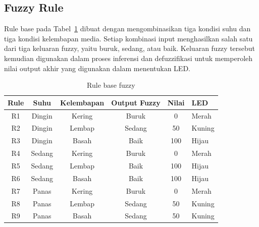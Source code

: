\documentclass[12pt,a4paper]{article}
\begin{document}
\subsection{Fuzzy Rule}

Rule base pada Tabel~\ref{tab:fuzzy-rule} dibuat dengan mengombinasikan tiga kondisi suhu dan tiga kondisi kelembapan media. Setiap kombinasi input menghasilkan salah satu dari tiga keluaran fuzzy, yaitu buruk, sedang, atau baik. Keluaran fuzzy tersebut kemudian digunakan dalam proses inferensi dan defuzzifikasi untuk memperoleh nilai output akhir yang digunakan dalam menentukan LED.

\begin{table}[H]
    \centering
    \caption{Rule base fuzzy}
    \label{tab:fuzzy-rule}
    \small
    \renewcommand{\arraystretch}{1.15}

    \begin{tabularx}{\textwidth}{c c c c c X}
        \toprule
        \textbf{Rule} &
        \textbf{Suhu} &
        \textbf{Kelembapan} &
        \textbf{Output Fuzzy} &
        \textbf{Nilai} &
        \textbf{LED} \\
        \midrule

        R1 &
        Dingin &
        Kering &
        Buruk &
        0 &
        Merah \\

        R2 &
        Dingin &
        Lembap &
        Sedang &
        50 &
        Kuning \\

        R3 &
        Dingin &
        Basah &
        Baik &
        100 &
        Hijau \\

        R4 &
        Sedang &
        Kering &
        Buruk &
        0 &
        Merah \\

        R5 &
        Sedang &
        Lembap &
        Baik &
        100 &
        Hijau \\

        R6 &
        Sedang &
        Basah &
        Baik &
        100 &
        Hijau \\

        R7 &
        Panas &
        Kering &
        Buruk &
        0 &
        Merah \\

        R8 &
        Panas &
        Lembap &
        Sedang &
        50 &
        Kuning \\

        R9 &
        Panas &
        Basah &
        Sedang &
        50 &
        Kuning \\

        \bottomrule
    \end{tabularx}
\end{table}
\end{document}
